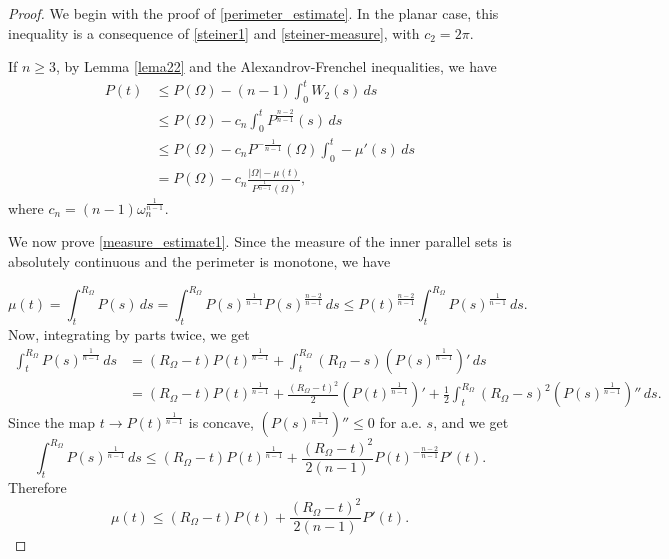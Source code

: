 \documentclass[10pt,a4paper]{amsart}
\newcommand{\abs}[1]{{\left|#1\right|}}
\begin{document}
\begin{proof}We begin with the proof of \eqref{perimeter_estimate}.  
In the planar case, this inequality is a consequence of \eqref{steiner1} and \eqref{steiner-measure}, with $c_2 = 2\pi$.


If $n\geq 3$, by Lemma \ref{lema22} and the Alexandrov-Frenchel inequalities, we have
\begin{align*}
          P(t) &\le P(\Omega)-(n-1)\int_0^tW_2(s)\,ds\\
         &\leq P(\Omega)- c_n \int_0^t P^{\frac{n-2}{n-1}}(s)\, ds\\
        &\leq P(\Omega)- c_n P^{-\frac{1}{n-1}}(\Omega)\int_0^t -\mu'(s)\, ds\\
         &=P(\Omega) - c_n \frac{\abs{\Omega} - \mu(t)}{P^{\frac{1}{n-1}}(\Omega)},
    \end{align*}
    where $c_n=(n-1)\omega_n^{\frac{1}{n-1}}$.

We now prove \eqref{measure_estimate1}.  
Since the measure of the inner parallel sets is absolutely continuous and the perimeter is monotone, we have

    \begin{equation*}
        \mu(t) = \int_{t}^{R_\Omega}P(s)\,ds = \int_{t}^{R_\Omega}P(s)^{\frac{1}{n-1}}P(s)^{\frac{n-2}{n-1}}\,ds\le P(t)^{\frac{n-2}{n-1}}\int_{t}^{R_\Omega}P(s)^{\frac{1}{n-1}}\,ds.
    \end{equation*}
    Now, integrating by parts twice, we get
    \begin{equation*}
    \begin{split}
    \int_{t}^{R_\Omega}P(s)^{\frac{1}{n-1}}\,ds &= (R_\Omega-t)P(t)^{\frac{1}{n-1}}+\int_t^{R_\Omega}(R_\Omega-s)(P(s)^{\frac{1}{n-1}})'\,ds \\
    &=(R_\Omega-t)P(t)^{\frac{1}{n-1}}+\frac{(R_\Omega-t)^2}{2}(P(t)^{\frac{1}{n-1}})'+\frac{1}{2}\int_t^{R_\Omega}(R_\Omega-s)^2(P(s)^{\frac{1}{n-1}})''\,ds.
    \end{split}
\end{equation*}
Since the map $t\to P(t)^{\frac{1}{n-1}}$ is concave, $(P(s)^{\frac{1}{n-1}})''\le 0$ for a.e. $s$, and we get
\begin{equation*}
  \int_{t}^{R_\Omega}P(s)^{\frac{1}{n-1}}\,ds\le (R_\Omega-t)P(t)^{\frac{1}{n-1}}+\frac{(R_\Omega-t)^2}{2(n-1)}P(t)^{-\frac{n-2}{n-1}}P'(t)  . 
\end{equation*}
    Therefore
    \begin{equation*}
     \mu(t)\leq (R_\Omega-t)P(t)+ \frac{(R_\Omega-t)^2}{2(n-1)}P'(t).   
    \end{equation*}
\end{proof}
\end{document}
